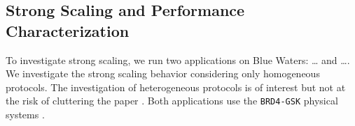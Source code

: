 
\subsection{Strong Scaling and Performance Characterization}


To investigate strong scaling, we run two applications on Blue Waters: \ldots
and \ldots {}. We investigate the
strong scaling behavior considering only homogeneous protocols. The
investigation of heterogeneous protocols is of interest but not at the risk
of cluttering the paper . Both applications use the \texttt{BRD4-GSK} physical
systems .

